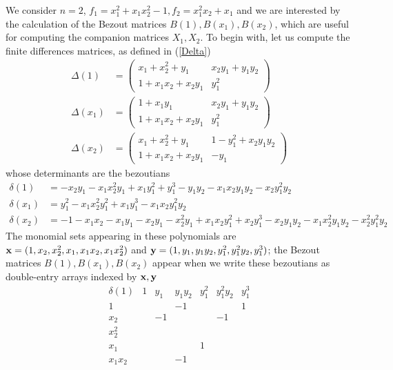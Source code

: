 \documentclass{standalone}
\begin{document}
\begin{exmp}
\label{bez_multi}
We consider $n = 2$, $f_1 = x_1^2 + x_1x_2^2 - 1, f_2 = x_1^2x_2 + x_1$ and we are interested by the calculation of the Bezout matrices $B(1), B(x_1), B(x_2)$, which are useful for computing the companion matrices $X_1, X_2$. To begin with, let us compute the finite differences matrices, as defined in (\ref{Delta})
\begin{align}
\Delta(1) &=
\begin{pmatrix}
x_1 + x_2^2 + y_1 & x_2y_1 + y_1y_2 \\
1 + x_1x_2 + x_2y_1 & y_1^2
\end{pmatrix} \nonumber  \\
\Delta(x_1) &=
\begin{pmatrix}
1 + x_1y_1 & x_2y_1 + y_1y_2 \\
1 + x_1x_2 + x_2y_1 & y_1^2
\end{pmatrix} \nonumber  \\
\Delta(x_2) &=
\begin{pmatrix}
x_1 + x_2^2 + y_1 & 1 - y_1^2 + x_2y_1y_2 \\
1 + x_1x_2 + x_2y_1  & -y_1
\end{pmatrix} \nonumber
\end{align}
whose determinants are the bezoutians
\begin{align}
\delta(1) &= -x_2y_1 - x_1x_2^2y_1 + x_1y_1^2 + y_1^3 - y_1y_2 - x_1x_2y_1y_2 - x_2y_1^2y_2 \nonumber \\
\delta(x_1) &=  y_1^2 - x_1x_2^2y_1^2 + x_1y_1^3 - x_1x_2y_1^2y_2 \nonumber \\
\delta(x_2) &= -1 - x_1x_2 - x_1y_1 -x_2y_1 - x_2^2y_1 + x_1x_2y_1^2 + x_2y_1^3 - x_2y_1y_2 - x_1x_2^2y_1y_2 - x_2^2y_1^2y_2\nonumber
\end{align}
The monomial sets appearing in these polynomials are
$\bold{x} = (1, x_2, x_2^2, x_1, x_1x_2, x_1x_2^2)$ and $\bold{y} = (1, y_1, y_1y_2, y_1^2, y_1^2y_2, y_1^3)$; the Bezout matrices $B(1), B(x_1), B(x_2)$ appear when we write these bezoutians as double-entry arrays indexed by $\bold{x}, \bold{y}$
$$\begin{array}{c|cccccc}
	\delta(1) & 1 & y_1 & y_1y_2 & y_1^2 & y_1^2y_2 & y_1^3 \\
	\hline
	1 &  &  & -1 &  &  & 1\\
	x_2 &  & -1 &  &  & -1 & \\
	x_2^2 &  &  &  &  &  & \\
	x_1 &  &  &  & 1 &  & \\
	x_1x_2 &  &  & -1 &  &  & \\

\end{array}$$
\end{exmp}
\end{document}
